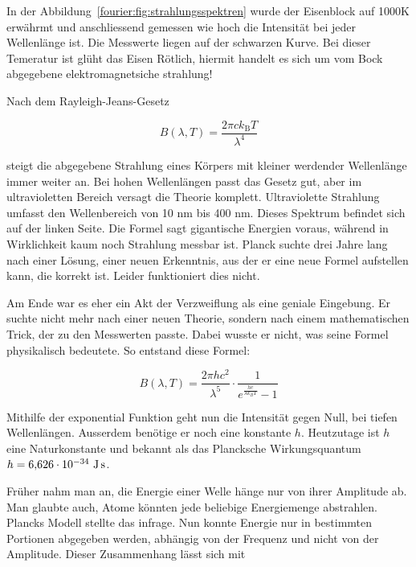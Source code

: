 	
	
	In der Abbildung~\ref{fourier:fig:strahlungsspektren} wurde der Eisenblock auf 1000K erwährmt und anschliessend gemessen wie hoch die Intensität bei jeder Wellenlänge ist. 
	Die Messwerte liegen auf der schwarzen Kurve.
	Bei dieser Temeratur ist glüht das Eisen Rötlich, hiermit handelt es sich um vom Bock abgegebene elektromagnetsiche strahlung!
	
	
	Nach dem Rayleigh-Jeans-Gesetz 
	
	\begin{equation}
		B(\lambda, T) = \frac{2 \pi c k_\mathrm{B} T}{\lambda^4}
	\end{equation}
	
	steigt die abgegebene Strahlung eines Körpers mit kleiner werdender Wellenlänge immer weiter an. 
	Bei hohen Wellenlängen passt das Gesetz gut, aber im ultravioletten Bereich versagt die Theorie komplett. Ultraviolette Strahlung umfasst den Wellenbereich von 10 nm bis 400 nm. 
	Dieses Spektrum befindet sich auf der linken Seite.
	Die Formel sagt gigantische Energien voraus, während in Wirklichkeit kaum noch Strahlung messbar ist.
	Planck suchte drei Jahre lang nach einer Lösung, einer neuen Erkenntnis, aus der er eine neue Formel aufstellen kann, die korrekt ist. 
	Leider funktioniert dies nicht.
	
	
	Am Ende war es eher ein Akt der Verzweiflung als eine geniale Eingebung. Er suchte nicht mehr nach einer neuen Theorie, sondern nach einem mathematischen Trick, der zu den Messwerten passte. 
	Dabei wusste er nicht, was seine Formel physikalisch bedeutete.
	So entstand diese Formel: 
	
	\begin{equation}
		B(\lambda, T) = \frac{2 \pi h c^2}{\lambda^5} \cdot \frac{1}{e^{\frac{h c}{\lambda k_B T}} - 1}
	\end{equation}
	
	Mithilfe der exponential Funktion geht nun die Intensität gegen Null, bei tiefen Wellenlängen. Ausserdem benötige er noch eine konstante $h$. Heutzutage ist $h$ eine Naturkonstante und bekannt als das Plancksche Wirkungsquantum $h = 6{,}626 \cdot 10^{-34} \ \text{J\,s}$. 
	


	
	
	
	Früher nahm man an, die Energie einer Welle hänge nur von ihrer Amplitude ab. 
	Man glaubte auch, Atome könnten jede beliebige Energiemenge abstrahlen. 
	Plancks Modell stellte das infrage. 
	Nun konnte Energie nur in bestimmten Portionen abgegeben werden, abhängig von der Frequenz und nicht von der Amplitude. 
	Dieser Zusammenhang lässt sich mit  
	
